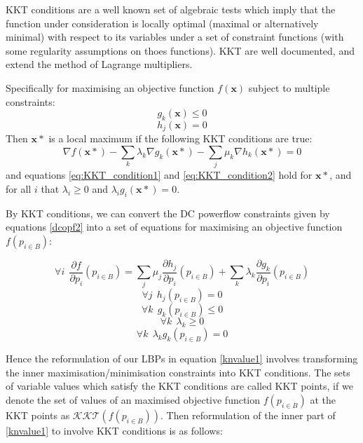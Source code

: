 KKT conditions are a well known set of algebraic tests which imply that the function under consideration is locally optimal (maximal or alternatively minimal) with respect to its variables under a set of constraint functions (with some regularity assumptions on thoes functions).
KKT are well documented, and extend the method of Lagrange multipliers.

Specifically for maximising an objective function $f(\mathbf{x})$ subject to multiple constraints:
\begin{equation}\label{eq:KKT_condition1} g_k(\mathbf{x})\le 0 \end{equation}
\begin{equation}\label{eq:KKT_condition2} h_j(\mathbf{x})=0 \end{equation}
Then $\mathbf{x}*$ is a local maximum if the following KKT conditions are true:
\begin{equation}\label{eq:KKT_conditions3} \nabla f(\mathbf{x}*) - \sum_k\lambda_k\nabla g_k(\mathbf{x}*) - \sum_j\mu_k\nabla h_k(\mathbf{x}*) =0\end{equation}
and equations \ref{eq:KKT_condition1} and \ref{eq:KKT_condition2} hold for $\mathbf{x}*$, and for all $i$ that $\lambda_i\ge 0$ and $\lambda_ig_i(\mathbf{x}*)=0$.

By KKT conditions, we can convert the DC powerflow constraints given by equations \ref{dcopf2} into a set of equations for maximising an objective function $f(p_{i\in B})$:

\begin{equation}\forall i~~\frac{\partial f}{\partial p_i}(p_{i\in B})=\sum_j\mu_j\frac{\partial h_j}{\partial p_i}(p_{i\in B}) + \sum_k\lambda_k\frac{\partial g_k}{\partial p_i}(p_{i\in B})\end{equation}
\begin{equation}\forall j~~ h_j(p_{i\in B})=0\end{equation}
\begin{equation}\forall k~~ g_k(p_{i\in B})\le 0\end{equation}
\begin{equation}\forall k~~ \lambda_k \ge 0\end{equation}
\begin{equation}\label{eq:complementarity_constraint_KKT}\forall k~~ \lambda_kg_k(p_{i\in B}) = 0\end{equation}

Hence the reformulation of our LBPs in equation \ref{knvalue1} involves transforming the inner maximisation/minimisation constraints into KKT conditions.
The sets of variable values which satisfy the KKT conditions are called KKT points, if we denote the set of values of an maximised objective function $f(p_{i\in B})$ at the KKT points as $\mathcal{KKT}(f(p_{i\in B}))$.
Then reformulation of the inner part of \eqref{knvalue1} to involve KKT conditions is as follows:

